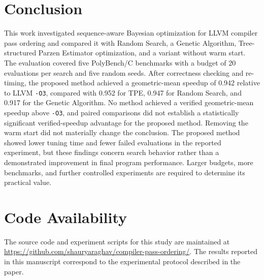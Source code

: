 \section{Conclusion}
This work investigated sequence-aware Bayesian optimization for LLVM compiler pass ordering and compared it with Random Search, a Genetic Algorithm, Tree-structured Parzen Estimator optimization, and a variant without warm start. The evaluation covered five PolyBench/C benchmarks with a budget of 20 evaluations per search and five random seeds. After correctness checking and re-timing, the proposed method achieved a geometric-mean speedup of 0.942 relative to LLVM \texttt{-O3}, compared with 0.952 for TPE, 0.947 for Random Search, and 0.917 for the Genetic Algorithm. No method achieved a verified geometric-mean speedup above \texttt{-O3}, and paired comparisons did not establish a statistically significant verified-speedup advantage for the proposed method. Removing the warm start did not materially change the conclusion. The proposed method showed lower tuning time and fewer failed evaluations in the reported experiment, but these findings concern search behavior rather than a demonstrated improvement in final program performance. Larger budgets, more benchmarks, and further controlled experiments are required to determine its practical value.

\section*{Code Availability}
The source code and experiment scripts for this study are maintained at \url{https://github.com/shauryaraghav/compiler-pass-ordering/}. The results reported in this manuscript correspond to the experimental protocol described in the paper.
